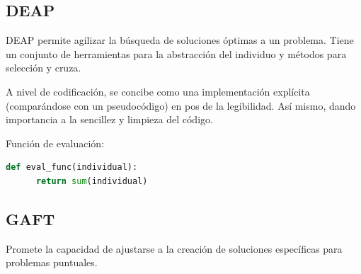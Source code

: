 \documentclass[10pt,dvipsnames]{beamer}
\begin{document}
  \begin{frame} \section*{DEAP}
    \begin{blur}[title={DEAP}]

      DEAP permite agilizar la búsqueda
      de soluciones óptimas a un problema. Tiene un conjunto de
      herramientas para la abstracción del individuo y métodos para
      selección y cruza. \cite{nash51}

      A nivel de codificación, se concibe como una implementación
      explícita (comparándose con un pseudocódigo) en pos de la
      legibilidad. Así mismo, dando importancia a la sencillez y limpieza
      del código. \cite{ffmmdeap}

    \end{blur}
  \end{frame}

  \begin{frame}[fragile]
    \begin{blur}[title={Una demostración con DEAP}]

      Función de evaluación:
\begin{center} \begin{lstlisting}[language=python]
    def eval_func(individual):
      return sum(individual)
\end{lstlisting} \end{center}

    \end{blur}
  \end{frame}

  \begin{frame} \section*{GAFT}
    \begin{blur}[title={GAFT}]

    Promete la capacidad de ajustarse a la creación de soluciones
    específicas para problemas puntuales. 

    \end{blur}
  \end{frame}

  \begin{frame}
    \begin{blur}
      \printbibliography
    \end{blur}
  \end{frame}
\end{document}
